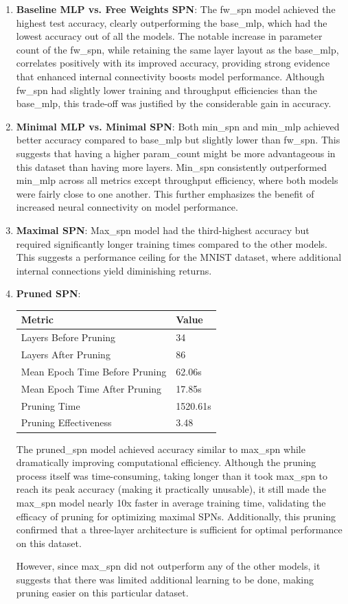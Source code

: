 \begin{enumerate}
\item \textbf{Baseline MLP vs. Free Weights SPN}: The fw\_spn model achieved the highest test accuracy, clearly outperforming the base\_mlp, which had the lowest accuracy out of all the models. The notable increase in parameter count of the fw\_spn, while retaining the same layer layout as the base\_mlp, correlates positively with its improved accuracy, providing strong evidence that enhanced internal connectivity boosts model performance. Although fw\_spn had slightly lower training and throughput efficiencies than the base\_mlp, this trade-off was justified by the considerable gain in accuracy.
\item \textbf{Minimal MLP vs. Minimal SPN}: Both min\_spn and min\_mlp achieved better accuracy compared to base\_mlp but slightly lower than fw\_spn. This suggests that having a higher param\_count might be more advantageous in this dataset than having more layers. Min\_spn consistently outperformed min\_mlp across all metrics except throughput efficiency, where both models were fairly close to one another. This further emphasizes the benefit of increased neural connectivity on model performance.
\item \textbf{Maximal SPN}: Max\_spn model had the third-highest accuracy but required significantly longer training times compared to the other models. This suggests a performance ceiling for the MNIST dataset, where additional internal connections yield diminishing returns.
\item \textbf{Pruned SPN}:
\begin{center}  %
\begin{tabular}{|l|l|}
\hline
\textbf{Metric} & \textbf{Value} \\
\hline
Layers Before Pruning & 34 \\
Layers After Pruning & 86 \\
Mean Epoch Time Before Pruning & 62.06s \\
Mean Epoch Time After Pruning & 17.85s \\
Pruning Time & 1520.61s \\
Pruning Effectiveness & 3.48 \\
\hline
\end{tabular}
\end{center}
The pruned\_spn model achieved accuracy similar to max\_spn while dramatically improving computational efficiency. Although the pruning process itself was time-consuming, taking longer than it took max\_spn to reach its peak accuracy (making it practically unusable), it still made the max\_spn model nearly 10x faster in average training time, validating the efficacy of pruning for optimizing maximal SPNs. Additionally, this pruning confirmed that a three-layer architecture is sufficient for optimal performance on this dataset. 

However, since max\_spn did not outperform any of the other models, it suggests that there was limited additional learning to be done, making pruning easier on this particular dataset.
\end{enumerate}

